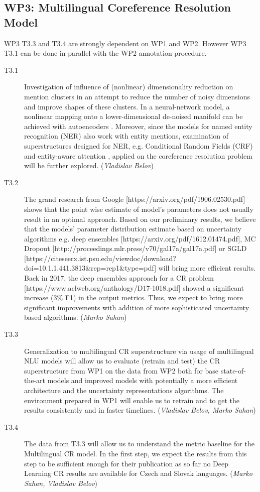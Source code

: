 \subsection*{WP3: Multilingual Coreference Resolution Model}

WP3 T3.3 and T3.4  are strongly dependent on WP1 and WP2. However WP3 T3.1 can be done in parallel with the WP2 annotation procedure.

\begin{description}
	\item [T3.1] Investigation of influence of (nonlinear) dimensionality reduction on mention clusters in an attempt to reduce the number of noisy dimensions and improve shapes of these clusters. In a neural-network model, a nonlinear mapping onto a lower-dimensional de-noised manifold can be achieved with autoencoders \cite{autoencoders-Zabalza2016,autoencoders-Sahay2019}. Moreover, since the models for named entity recognition (NER) also work with entity mentions, examination of superstructures designed for NER, e.g. Conditional Random Fields (CRF) \cite{ner-Strakova2019,ner-Zhanming2019} and entity-aware attention \cite{ner-Yamada2020}, applied on the coreference resolution problem will be further explored. (\textit{Vladislav Belov})
	\item [T3.2] The grand research from Google [https://arxiv.org/pdf/1906.02530.pdf] shows that the point wise estimate of model’s parameters does not usually result in an optimal approach. Based on our preliminary results, we believe that the models’ parameter distribution estimate based on uncertainty algorithms e.g. deep ensembles [https://arxiv.org/pdf/1612.01474.pdf], MC Dropout [http://proceedings.mlr.press/v70/gal17a/gal17a.pdf] or SGLD [https://citeseerx.ist.psu.edu/viewdoc/download?doi=10.1.1.441.3813\&rep=rep1\&type=pdf] will bring more efficient results. Back in 2017, the deep ensembles approach for a CR problem [https://www.aclweb.org/anthology/D17-1018.pdf] showed a significant increase (3\% F1) in the output metrics. Thus, we expect to bring more significant improvements with addition of more sophisticated uncertainty based algorithms. (\textit{Marko Sahan})
	\item [T3.3] Generalization to multilingual CR superstructure via usage of multilingual NLU models will allow us to evaluate (retrain and test) the CR superstructure from WP1 on the data from WP2 both for base state-of-the-art models and improved models with potentially a more efficient architecture and the uncertainty representations algorithms. The environment prepared in WP1 will enable us to retrain and to get the results consistently and in faster timelines. (\textit{Vladislav Belov, Marko Sahan})	
	\item  [T3.4] The data from T3.3 will allow us to understand the metric baseline for the Multilingual CR model. In the first step, we expect the results from this step to be sufficient enough for their publication as so far no Deep Learning CR results are available for Czech and Slovak languages. (\textit{Marko Sahan, Vladislav Belov})

\end{description}


